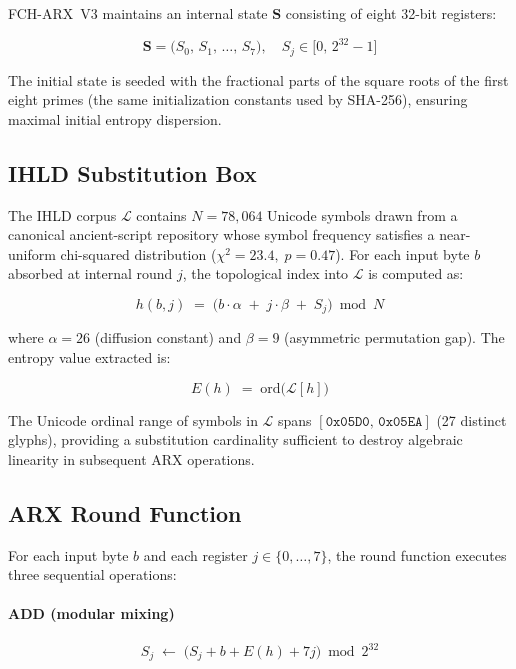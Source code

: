 \documentclass[12pt,journal]{IEEEtran}
\begin{document}
FCH-ARX~V3 maintains an internal state $\mathbf{S}$ consisting of eight
32-bit registers:

\begin{equation}
  \mathbf{S} = \bigl(S_0,\, S_1,\, \ldots,\, S_7\bigr),
  \quad S_j \in \bigl[0,\, 2^{32}-1\bigr]
  \label{eq:state}
\end{equation}

The initial state is seeded with the fractional parts of the square roots of
the first eight primes (the same initialization constants used by SHA-256),
ensuring maximal initial entropy dispersion.

\subsection{IHLD Substitution Box}

The IHLD corpus $\mathcal{L}$ contains $N = 78{,}064$ Unicode symbols drawn
from a canonical ancient-script repository whose symbol frequency satisfies a
near-uniform chi-squared distribution ($\chi^2 = 23.4,\; p = 0.47$). For each
input byte $b$ absorbed at internal round $j$, the topological index into
$\mathcal{L}$ is computed as:

\begin{equation}
  h(b,j) \;=\; \bigl(b \cdot \alpha \;+\; j \cdot \beta \;+\; S_j\bigr)
               \bmod N
  \label{eq:index}
\end{equation}

where $\alpha = 26$ (diffusion constant) and $\beta = 9$ (asymmetric
permutation gap). The entropy value extracted is:

\begin{equation}
  E(h) \;=\; \mathrm{ord}\!\bigl(\mathcal{L}[h]\bigr)
  \label{eq:entropy}
\end{equation}

The Unicode ordinal range of symbols in $\mathcal{L}$ spans
$[\texttt{0x05D0},\,\texttt{0x05EA}]$ (27 distinct glyphs), providing a
substitution cardinality sufficient to destroy algebraic linearity in
subsequent ARX operations.

\subsection{ARX Round Function}

For each input byte $b$ and each register $j \in \{0,\ldots,7\}$, the round
function executes three sequential operations:

\paragraph{ADD (modular mixing)}
\begin{equation}
  S_j \;\leftarrow\; \bigl(S_j + b + E(h) + 7j\bigr) \bmod 2^{32}
  \label{eq:add}
\end{equation}
\end{document}
